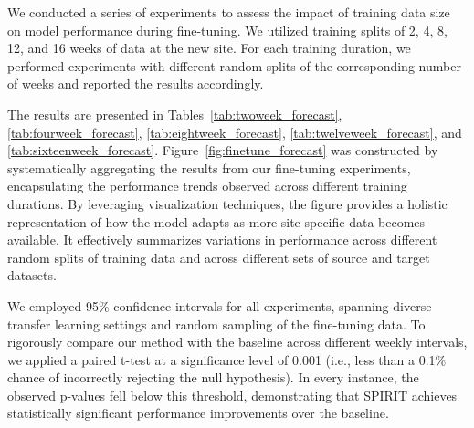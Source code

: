 We conducted a series of experiments to assess the impact of training data size on model performance during fine-tuning. We utilized training splits of 2, 4, 8, 12, and 16 weeks of data at the new site. For each training duration, we performed experiments with different random splits of the corresponding number of weeks and reported the results accordingly.

The results are presented in Tables~\ref{tab:twoweek_forecast}, \ref{tab:fourweek_forecast}, \ref{tab:eightweek_forecast}, \ref{tab:twelveweek_forecast}, and \ref{tab:sixteenweek_forecast}. Figure~\ref{fig:finetune_forecast} was constructed by systematically aggregating the results from our fine-tuning experiments, encapsulating the performance trends observed across different training durations. By leveraging visualization techniques, the figure provides a holistic representation of how the model adapts as more site-specific data becomes available. It effectively summarizes variations in performance across different random splits of training data and across different sets of source and target datasets. 

We employed 95\% confidence intervals for all experiments, spanning diverse transfer learning settings and random sampling of the fine-tuning data. To rigorously compare our method with the baseline across different weekly intervals, we applied a paired t-test at a significance level of 0.001 (i.e., less than a 0.1\% chance of incorrectly rejecting the null hypothesis). In every instance, the observed p-values fell below this threshold, demonstrating that SPIRIT achieves statistically significant performance improvements over the baseline.